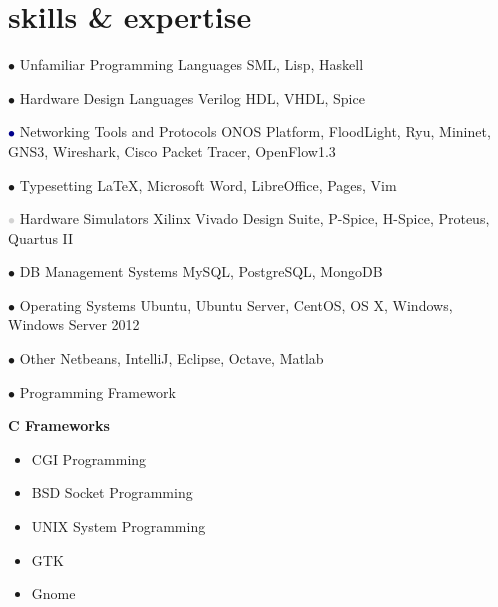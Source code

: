 \documentclass[]{friggeri-cv} %
\begin{document}
\section{skills \& expertise}

\begin{entrylist}

\entry
{\textcolor{TextGreen}{$\bullet$}}
{Unfamiliar Programming Languages}
{}
{SML, Lisp, Haskell}


\entry
{\textcolor{TextOrange}{$\bullet$}}
{Hardware Design Languages}
{}
{Verilog HDL, VHDL, Spice}


\entry
{\textcolor{DarkBlue}{$\bullet$}}
{Networking Tools and Protocols}
{}
{ONOS Platform, FloodLight, Ryu, Mininet, GNS3, Wireshark, Cisco Packet Tracer, OpenFlow1.3}


\entry
{\textcolor{Ocean}{$\bullet$}}
{Typesetting}
{}
{\LaTeX, Microsoft Word, LibreOffice, Pages, Vim}


\entry
{\textcolor{LightGray}{$\bullet$}}
{Hardware Simulators}
{}
{Xilinx Vivado Design Suite, P-Spice, H-Spice, Proteus, Quartus II}


\entry
{\textcolor{TextYellow}{$\bullet$}}
{DB Management Systems}
{}
{MySQL, PostgreSQL, MongoDB}


\entry
{\textcolor{TextRed}{$\bullet$}}
{Operating Systems}
{}
{Ubuntu, Ubuntu Server, CentOS, OS X, Windows, Windows Server 2012}


\entry
{\textcolor{TextPink}{$\bullet$}}
{Other}
{}
{Netbeans, IntelliJ, Eclipse, Octave, Matlab}


\entry
{\textcolor{UniBlue}{$\bullet$}}
{Programming Framework}
{}
{
	\textbf{C Frameworks}
	\begin{itemize}
		\item CGI Programming
		\item BSD Socket Programming
		\item UNIX System Programming
		\item GTK
		\item Gnome
	\end{itemize}
	
}
\end{entrylist}
\end{document}
